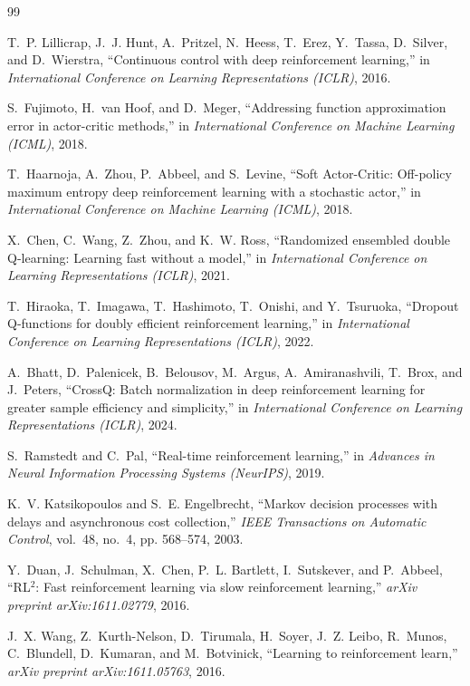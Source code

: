 \documentclass[conference]{IEEEtran}
\begin{document}
\begingroup
{}
\begin{thebibliography}{99}

T.~P. Lillicrap, J.~J. Hunt, A.~Pritzel, N.~Heess, T.~Erez, Y.~Tassa, D.~Silver, and D.~Wierstra, ``Continuous control with deep reinforcement learning,'' in \emph{International Conference on Learning Representations (ICLR)}, 2016.

S.~Fujimoto, H.~van Hoof, and D.~Meger, ``Addressing function approximation error in actor-critic methods,'' in \emph{International Conference on Machine Learning (ICML)}, 2018.

T.~Haarnoja, A.~Zhou, P.~Abbeel, and S.~Levine, ``Soft Actor-Critic: Off-policy maximum entropy deep reinforcement learning with a stochastic actor,'' in \emph{International Conference on Machine Learning (ICML)}, 2018.

X.~Chen, C.~Wang, Z.~Zhou, and K.~W. Ross, ``Randomized ensembled double Q-learning: Learning fast without a model,'' in \emph{International Conference on Learning Representations (ICLR)}, 2021.

T.~Hiraoka, T.~Imagawa, T.~Hashimoto, T.~Onishi, and Y.~Tsuruoka, ``Dropout Q-functions for doubly efficient reinforcement learning,'' in \emph{International Conference on Learning Representations (ICLR)}, 2022.

A.~Bhatt, D.~Palenicek, B.~Belousov, M.~Argus, A.~Amiranashvili, T.~Brox, and J.~Peters, ``CrossQ: Batch normalization in deep reinforcement learning for greater sample efficiency and simplicity,'' in \emph{International Conference on Learning Representations (ICLR)}, 2024.

S.~Ramstedt and C.~Pal, ``Real-time reinforcement learning,'' in \emph{Advances in Neural Information Processing Systems (NeurIPS)}, 2019.

K.~V. Katsikopoulos and S.~E. Engelbrecht, ``Markov decision processes with delays and asynchronous cost collection,'' \emph{IEEE Transactions on Automatic Control}, vol.~48, no.~4, pp. 568--574, 2003.

Y.~Duan, J.~Schulman, X.~Chen, P.~L. Bartlett, I.~Sutskever, and P.~Abbeel, ``RL$^2$: Fast reinforcement learning via slow reinforcement learning,'' \emph{arXiv preprint arXiv:1611.02779}, 2016.

J.~X. Wang, Z.~Kurth-Nelson, D.~Tirumala, H.~Soyer, J.~Z. Leibo, R.~Munos, C.~Blundell, D.~Kumaran, and M.~Botvinick, ``Learning to reinforcement learn,'' \emph{arXiv preprint arXiv:1611.05763}, 2016.


\end{thebibliography}
\end{document}
